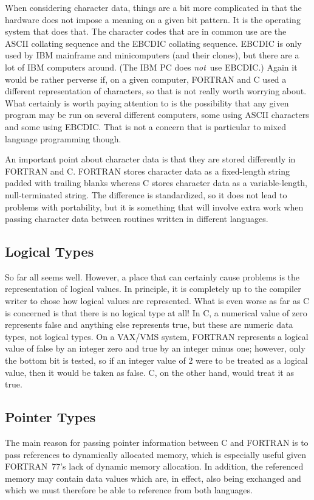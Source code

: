 \documentclass[twoside,11pt]{article}
\newcommand{\xlabel}[1]{}
\renewcommand{\_}{\texttt{\symbol{95}}}
\begin{document}
When considering character data, things are a bit more complicated in that the
hardware does not impose a meaning on a given bit pattern. It is the operating
system that does that. The character codes that are in common use are the ASCII
collating sequence and the EBCDIC collating sequence. EBCDIC is only used by
IBM mainframe and minicomputers (and their clones), but there are a lot of IBM
computers around. (The IBM PC does {\it not}\, use EBCDIC\@.) Again it would be
rather perverse if, on a given computer, FORTRAN and C used a different
representation of characters, so that is not really worth worrying about. What
certainly is worth paying attention to is the possibility that any given
program may be run on several different computers, some using ASCII characters
and some using EBCDIC\@. That is not a concern that is particular to mixed
language programming though.

An important point about character data is that they are stored differently in
FORTRAN and C\@. FORTRAN stores character data as a fixed-length string padded
with trailing blanks whereas C stores character data as a variable-length, 
null-terminated string. 
The difference is standardized, so it does not lead to
problems with portability, but it is something that will involve extra work
when passing character data between routines written in different languages.

\subsection{\xlabel{logical_types}Logical Types}

So far all seems well. However, a place that can certainly cause problems is
the representation of logical values. In principle, it is completely up to the
compiler writer to chose how logical values are represented. What is even worse
as far as C is concerned is that there is no logical type at all! In C, a
numerical value of zero represents false and anything else represents true, but
these are numeric data types, not logical types. On a VAX/VMS system, FORTRAN
represents a logical value of false by an integer zero and true by an integer
minus one; however, only the bottom bit is tested, so if an integer value of 2
were to be treated as a logical value, then it would be taken as false. C, on
the other hand, would treat it as true.

\subsection{\xlabel{pointer_types}Pointer Types}
The main reason for passing pointer information between C and FORTRAN
is to pass references to dynamically allocated memory, which is
especially useful given FORTRAN~77's lack of dynamic memory
allocation. In addition, the referenced memory may contain data values
which are, in effect, also being exchanged and which we must therefore
be able to reference from both languages.
\end{document}
